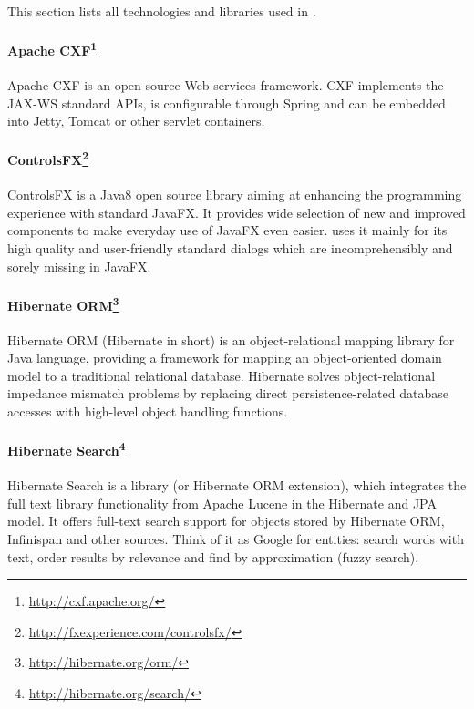 
\label{sec:UsedTechnologies}

This section lists all technologies and libraries used in \textan{}.


\paragraph{Apache CXF\footnote{\url{http://cxf.apache.org/}}}
Apache CXF is an open-source Web services framework. CXF implements the JAX-WS
standard APIs, is configurable through Spring and can be embedded into Jetty,
Tomcat or other servlet containers.

\paragraph{ControlsFX\footnote{\url{http://fxexperience.com/controlsfx/}}}
ControlsFX is a Java8 open source library aiming at enhancing the programming
experience with standard JavaFX. It provides wide selection of new and improved
components to make everyday use of JavaFX even easier. \textan{} uses it mainly
for its high quality and user-friendly standard dialogs which are
incomprehensibly and sorely missing in JavaFX.

\paragraph{Hibernate ORM\footnote{\url{http://hibernate.org/orm/}}}
Hibernate ORM (Hibernate in short) is an object-relational mapping library for
Java language, providing a framework for mapping an object-oriented domain
model to a traditional relational database. Hibernate solves object-relational
im\-pedance mismatch problems by replacing direct persistence-related database
accesses with high-level object handling functions.

\paragraph{Hibernate Search\footnote{\url{http://hibernate.org/search/}}}
Hibernate Search is a library (or Hibernate ORM extension), which integrates
the full text library functionality from Apache Lucene in the Hibernate and
JPA model. It offers full-text search support for objects stored by Hibernate
ORM, Infinispan and other sources. Think of it as Google\texttrademark{} for
entities: search words with text, order results by relevance and find by
approximation (fuzzy search).

